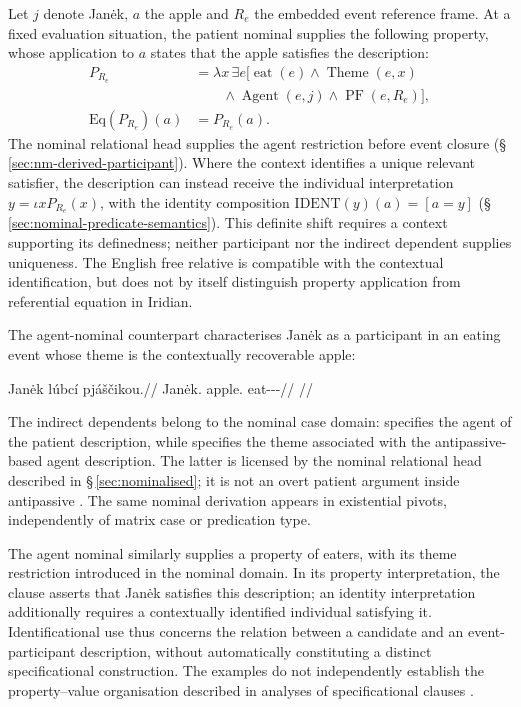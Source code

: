 Let \(j\) denote Janėk, \(a\) the apple and \(R_e\) the embedded
event reference frame. At a fixed evaluation situation, the patient nominal
supplies the following property, whose application to \(a\) states that
the apple satisfies the description:
\[
\begin{aligned}
 P_{R_e}&=\lambda x\,\exists e[\operatorname{eat}(e)
   \land\operatorname{Theme}(e,x)\\
   &\qquad\land\operatorname{Agent}(e,j)
   \land\operatorname{PF}(e,R_e)],\\
 \mathrm{Eq}(P_{R_e})(a)&=P_{R_e}(a).
\end{aligned}
\]
The nominal relational head supplies the agent restriction before event
closure (§\,\ref{sec:nm-derived-participant}). Where the context
identifies a unique relevant satisfier, the description can instead receive
the individual interpretation \(y=\iota x P_{R_e}(x)\), with the identity
composition \(\mathrm{IDENT}(y)(a)=[a=y]\)
(§\,\ref{sec:nominal-predicate-semantics}). This definite shift requires
a context supporting its definedness; neither participant  nor
the indirect dependent supplies uniqueness. The English free relative
 is compatible with the contextual identification, but
does not by itself distinguish property application from referential
equation in Iridian.

The agent-nominal counterpart characterises Janėk as a participant in an
eating event whose theme is the contextually recoverable apple:

\ex
\begingl
\gla Janėk lúbcí pjáščikou.//
\glb Janėk.\Dir{} apple.\Ind{} eat-\Antip{}-\Pf{}-\Nmlz{}//
\glft {}//
\endgl
\xe

\noindent The indirect dependents belong to the nominal case domain:
 specifies the agent of the patient description, while
 specifies the theme associated with the antipassive-based agent
description. The latter is licensed by the nominal relational head described
in §\,\ref{sec:nominalised}; it is not an overt patient argument inside
antipassive . The same nominal derivation appears in existential
pivots, independently of matrix case or predication type.

The agent nominal similarly supplies a property of eaters, with its theme
restriction introduced in the nominal domain. In its property interpretation,
the clause asserts that Janėk satisfies this description; an identity
interpretation additionally requires a contextually identified individual
satisfying it. Identificational use thus concerns the relation between a
candidate and an event-participant description, without automatically
constituting a distinct specificational construction. The examples do not
independently establish the property--value organisation described in
analyses of specificational clauses \cite[§4.1]{djarv2021}.

